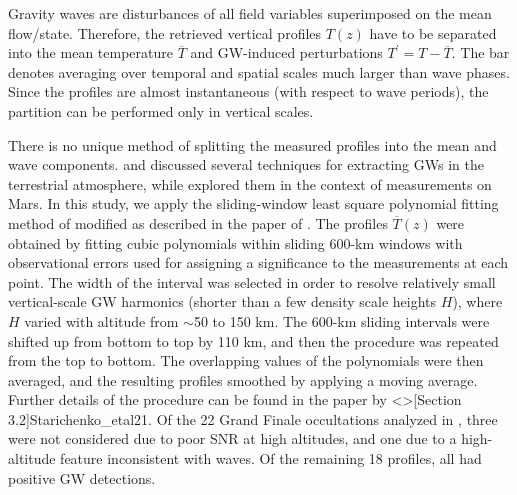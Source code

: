 Gravity waves are disturbances of all field variables superimposed on the mean flow/state. Therefore, the retrieved vertical profiles $T(z)$ have to be separated into the mean temperature $\overline{T}$ and GW-induced perturbations $T^\prime=T-\overline{T}$. The bar denotes averaging over temporal and spatial scales much larger than wave phases. Since the profiles are almost instantaneous (with respect to wave periods), the partition can be performed only in vertical scales. 

There is no unique method of splitting the measured profiles into the mean and wave components.  and  discussed several techniques for extracting GWs in the terrestrial atmosphere, while  explored them in the context of measurements on Mars. In this study, we apply the sliding-window least square polynomial fitting method of  modified as described in the paper of . The profiles $\overline{T}(z)$ were obtained by fitting cubic polynomials within sliding 600-km windows with observational errors used for assigning a significance to the measurements at each point. The width of the interval was selected in order to resolve relatively small vertical-scale GW harmonics (shorter than a few density scale heights $H$), where $H$ varied with altitude from $\sim$50 to 150 km. The 600-km sliding intervals were shifted up from bottom to top by 110 km, and then the procedure was repeated from the top to bottom. The overlapping values of the polynomials were then averaged, and the resulting profiles smoothed by applying a moving average. Further details of the procedure can be found in the paper by \citeA<>[Section 3.2]{Starichenko_etal21}. Of the 22 Grand Finale occultations analyzed in \cite{Brown20}, three were not considered due to poor SNR at high altitudes, and one due to a high-altitude feature inconsistent with waves. Of the remaining 18 profiles, all had positive GW detections.

